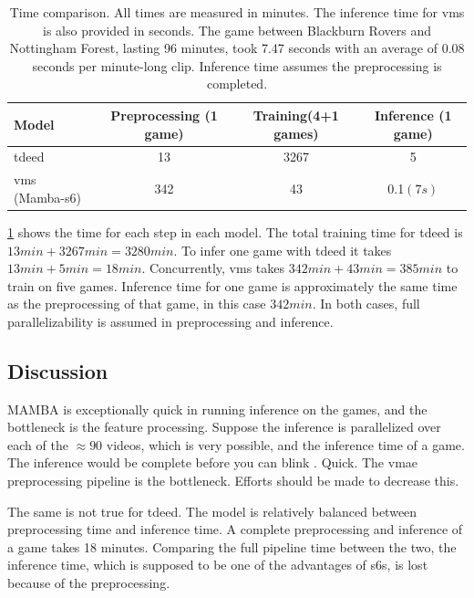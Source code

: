 


\begin{table}[ht]
    \centering
    \begin{tabular}{lccc}
        \toprule 
        Model & Preprocessing (1 game)  & Training(4+1 games) & Inference (1 game) \\
        \midrule
        \acrshort{tdeed} & 13 & 3267 & 5\\
        \acrshort{vms} (Mamba-\acrshort{s6}) & 342 & 43 & 0.1$(7s)$ \\
        \bottomrule
    \end{tabular}
    \caption{Time comparison. All times are measured in minutes. The inference time for \acrshort{vms} is also provided in seconds. The game between Blackburn Rovers and Nottingham Forest, lasting 96 minutes, took 7.47 seconds with an average of 0.08 seconds per minute-long clip. Inference time assumes the preprocessing is completed.}
    \label{tab:results_ex2}
\end{table}

\cref{tab:results_ex2} shows the time for each step in each model. The total training time for \acrshort{tdeed} is \(13min+3267min= 3280min\). To infer one game with \acrshort{tdeed} it takes \(13min+5min=18min\). Concurrently, \acrshort{vms} takes \(342min+43min=385min\) to train on five games. Inference time for one game is approximately the same time as the preprocessing of that game, in this case \(342min\). In both cases, full parallelizability is assumed in preprocessing and inference. 

\subsection{Discussion}
\label{ssec:ex2_discussion}

MAMBA is exceptionally quick in running inference on the games, and the bottleneck is the feature processing. Suppose the inference is parallelized over each of the $\approx90$ videos, which is very possible, and the inference time of a game. The inference would be complete before you can blink \cite{bartoshuk_blinking_1977}. Quick. The \acrshort{vmae} preprocessing pipeline is the bottleneck. Efforts should be made to decrease this. 


The same is not true for \acrshort{tdeed}. The model is relatively balanced between preprocessing time and inference time. A complete preprocessing and inference of a game takes 18 minutes. Comparing the full pipeline time between the two, the inference time, which is supposed to be one of the advantages of \acrlong{s6}s, is lost because of the preprocessing. 



